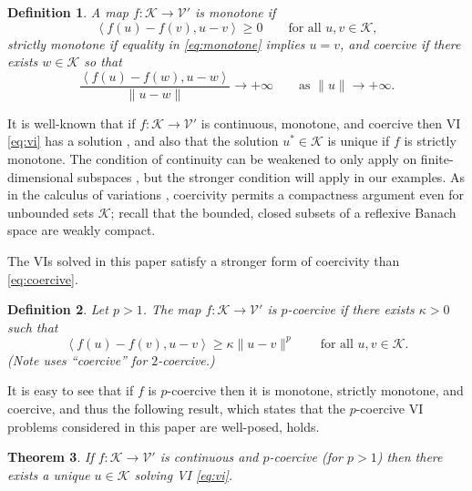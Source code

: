 \documentclass[letterpaper,final,12pt,reqno]{amsart}
\theoremstyle{cstyle}
\newtheorem{theorem}{Theorem}
\theoremstyle{dstyle}
\newtheorem{definition}[theorem]{Definition}
\numberwithin{equation}{section}
\numberwithin{figure}{section}
\numberwithin{table}{section}
\numberwithin{theorem}{section}
\newcommand{\cK}{\mathcal{K}}
\newcommand{\cV}{\mathcal{V}}
\newcommand{\ip}[2]{\left<#1,#2\right>}
\begin{document}
\begin{definition} A map $f:\cK \to \cV'$ is \emph{monotone} if
\begin{equation}
\ip{f(u)-f(v)}{u-v} \ge 0 \qquad \text{for all } u,v \in \cK, \label{eq:monotone}
\end{equation}
\emph{strictly monotone} if equality in \eqref{eq:monotone} implies $u=v$, and \emph{coercive} if there exists $w \in \cK$ so that
\begin{equation}
\frac{\ip{f(u)-f(w)}{u-w}}{\|u-w\|} \to +\infty \qquad \text{as } \|u\|\to +\infty. \label{eq:coercive}
\end{equation}
\end{definition}

It is well-known that if $f:\cK \to \cV'$ is continuous, monotone, and coercive then VI \eqref{eq:vi} has a solution \cite[Corollary III.1.8]{KinderlehrerStampacchia1980}, and also that the solution $u^* \in \cK$ is unique if $f$ is strictly monotone.  The condition of continuity can be weakened to only apply on finite-dimensional subspaces \cite{KinderlehrerStampacchia1980}, but the stronger condition will apply in our examples.  As in the calculus of variations \cite{Evans2010}, coercivity permits a compactness argument even for unbounded sets $\cK$; recall that the bounded, closed subsets of a reflexive Banach space are weakly compact.

The VIs solved in this paper satisfy a stronger form of coercivity than \eqref{eq:coercive}.

\begin{definition}  Let $p>1$.  The map $f:\cK \to \cV'$ is \emph{$p$-coercive} if there exists $\kappa>0$ such that
\begin{equation}
\ip{f(u)-f(v)}{u-v} \ge \kappa \|u-v\|^p \qquad \text{for all } u,v \in \cK. \label{eq:pcoercive}
\end{equation}
(Note \cite{Tai2003} uses ``coercive'' for $2$-coercive.)
\end{definition}

It is easy to see that if $f$ is $p$-coercive then it is monotone, strictly monotone, and coercive, and thus the following result, which states that the $p$-coercive VI problems considered in this paper are well-posed, holds.

\begin{theorem}  \label{thm:viwellposed}  If $f:\cK \to \cV'$ is continuous and $p$-coercive (for $p>1$) then there exists a unique $u\in \cK$ solving VI \eqref{eq:vi}.
\end{theorem}
\end{document}
